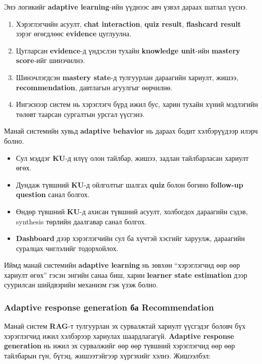\documentclass[12pt,A4]{report}
\begin{document}
Энэ логикийг \textbf{adaptive learning}-ийн үүднээс авч үзвэл дараах шатлал үүснэ.

\begin{enumerate}
    \item Хэрэглэгчийн асуулт, \textbf{chat interaction}, \textbf{quiz result}, \textbf{flashcard result} зэрэг өгөгдлөөс \textbf{evidence} цуглуулна.
    \item Цугларсан \textbf{evidence}-д үндэслэн тухайн \textbf{knowledge unit}-ийн \textbf{mastery score}-ийг шинэчилнэ.
    \item Шинэчлэгдсэн \textbf{mastery state}-д тулгуурлан дараагийн хариулт, жишээ, \textbf{recommendation}, давтлагын агуулгыг өөрчилнө.
    \item Ингэснээр систем нь хэрэглэгч бүрд ижил бус, харин тухайн хүний мэдлэгийн төлөвт таарсан сургалтын урсгал үүсгэнэ.
\end{enumerate}

Манай системийн хувьд \textbf{adaptive behavior} нь дараах бодит хэлбэрүүдээр илэрч болно.

\begin{itemize}
    \item Сул мэддэг \textbf{KU}-д илүү олон тайлбар, жишээ, задлан тайлбарласан хариулт өгөх.
    \item Дундаж түвшний \textbf{KU}-д ойлголтыг шалгах \textbf{quiz} болон богино \textbf{follow-up question} санал болгох.
    \item Өндөр түвшний \textbf{KU}-д ахисан түвшний асуулт, холбогдох дараагийн сэдэв, synthesis төрлийн даалгавар санал болгох.
    \item \textbf{Dashboard} дээр хэрэглэгчийн сул ба хүчтэй хэсгийг харуулж, дараагийн суралцах чиглэлийг тодорхойлох.
\end{itemize}

Иймд манай системийн \textbf{adaptive learning} нь зөвхөн ``хэрэглэгчид өөр өөр хариулт өгөх'' гэсэн энгийн санаа биш, харин \textbf{learner state estimation} дээр суурилсан шийдвэрийн механизм гэж үзэж болно.

\subsubsection*{Adaptive response generation ба Recommendation}

Манай систем \textbf{RAG}-т тулгуурлан эх сурвалжтай хариулт үүсгэдэг боловч бүх хэрэглэгчид ижил хэлбэрээр хариулах шаардлагагүй. \textbf{Adaptive response generation} нь ижил эх сурвалжийг өөр өөр түвшний хэрэглэгчид өөр өөр тайлбарын гүн, бүтэц, жишээтэйгээр хүргэхийг хэлнэ. Жишээлбэл:
\end{document}
